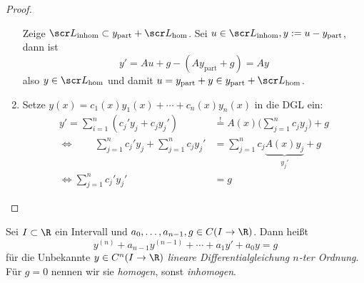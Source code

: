 \begin{st}
\begin{proof}
\begin{enumerate}[{2}a)]
				Zeige $\scr L_{\text{inhom}} \subset y_{\text{part}} + \scr L_{\text{hom}}$.
				Sei $u \in \scr L_{\text{inhom}}, y := u - y_{\text{part}}$, dann ist
				\[
					y' = Au + g - (A y_{\text{part}} + g) = Ay
				\]
				also $y \in \scr L_{\text{hom}}$ und damit $u = y_{\text{part}} + y \in y_{\text{part}} + \scr L_{\text{hom}}$.
			\item
				Setze $y(x) = c_1(x) y_1(x) + \dotsb + c_n(x) y_n(x)$ in die DGL ein:
				\begin{align*}
					y' = \sum_{i=1}^n (c_j' y_j + c_j y_j') &\stackrel != A(x) \bigg( \sum_{j=1}^n c_j y_j \bigg) + g \\
					\iff \qquad \sum_{j=1}^n c_j'y_j + \sum_{j=1}^n c_j y_j' &= \sum_{j=1}^n c_j \underbrace{A(x) y_j}_{y_j'} + g \\
					\iff \sum_{j=1}^n c_j' y_j' &= g
				\end{align*}
		\end{enumerate}
	\end{proof}
\end{st}

\begin{df} \label{4.4}
	Sei $I \subset \R$ ein Intervall und $a_0, \dotsc, a_{n-1}, g \in C(I \to \R)$.
	Dann heißt
	\[
		y^{(n)} + a_{n-1} y^{(n-1)} + \dotsb + a_1 y' + a_0 y = g
	\]
	für die Unbekannte $y \in C^n(I \to \R)$ \emph{lineare Differentialgleichung $n$-ter Ordnung}.
	Für $g = 0$ nennen wir sie \emph{homogen}, sonst \emph{inhomogen}.
\end{df}


